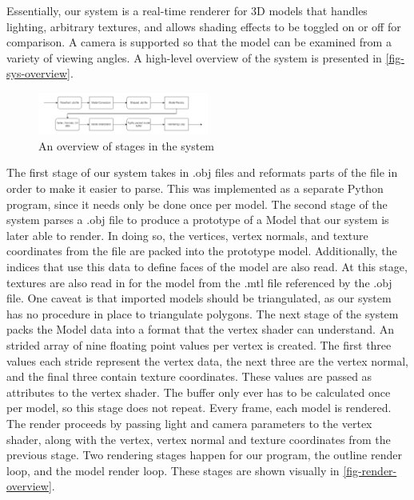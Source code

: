 Essentially, our system is a real-time renderer for 3D models that handles lighting, arbitrary
textures, and allows shading effects to be toggled on or off for comparison. A camera is supported
so that the model can be examined from a variety of viewing angles. A high-level overview of the
system is presented in \autoref{fig-sys-overview}.

\begin{figure}[h]
    \centering
    \includegraphics[width=0.5\textwidth]{img/system-overview.png}
    \caption{An overview of stages in the system}
    \label{fig-sys-overview}
\end{figure}

The first stage of our system takes in .obj files and reformats parts of the file in order to make
it easier to parse. This was implemented as a separate Python program, since it needs only be done 
once per model.
The second stage of the system parses a .obj file to produce a prototype of a Model that our system
is later able to render. In doing so, the vertices, vertex normals, and texture coordinates from the
file are packed into the prototype model. Additionally, the indices that use this data to define
faces of the model are also read. At this stage, textures are also read in for the model from the
.mtl file referenced by the  .obj file. One caveat is that imported models should be triangulated,
as our system has no procedure in place to triangulate polygons.
The next stage of the system packs the Model data into a format that the vertex shader can 
understand. An strided array of nine floating point values per vertex is created. The first three
values each stride represent the vertex data, the next three are the vertex normal, and the final 
three contain texture coordinates. These values are passed as attributes to the vertex shader.
The buffer only ever has to be calculated once per model, so this stage does not repeat. 
Every frame, each model is rendered. The render proceeds by passing light and camera parameters to 
the vertex shader, along with the vertex, vertex normal and texture coordinates from the previous 
stage. Two rendering stages happen for our program, the outline render loop, and the model render
loop. These stages are shown visually in \autoref{fig-render-overview}.

